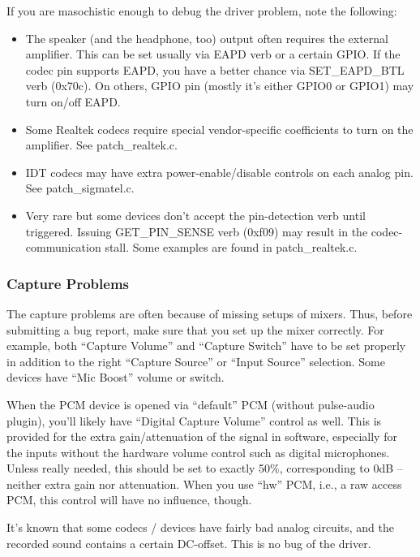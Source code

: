 \documentclass[a4paper,8pt,english]{sphinxmanual}
\begin{document}
If you are masochistic enough to debug the driver problem, note the
following:
\begin{itemize}
\item {} 
The speaker (and the headphone, too) output often requires the
external amplifier.  This can be set usually via EAPD verb or a
certain GPIO.  If the codec pin supports EAPD, you have a better
chance via SET\_EAPD\_BTL verb (0x70c).  On others, GPIO pin (mostly
it's either GPIO0 or GPIO1) may turn on/off EAPD.

\item {} 
Some Realtek codecs require special vendor-specific coefficients to
turn on the amplifier.  See patch\_realtek.c.

\item {} 
IDT codecs may have extra power-enable/disable controls on each
analog pin.  See patch\_sigmatel.c.

\item {} 
Very rare but some devices don't accept the pin-detection verb until
triggered.  Issuing GET\_PIN\_SENSE verb (0xf09) may result in the
codec-communication stall.  Some examples are found in
patch\_realtek.c.

\end{itemize}


\subsubsection{Capture Problems}
\label{sound/hd-audio/notes:capture-problems}
The capture problems are often because of missing setups of mixers.
Thus, before submitting a bug report, make sure that you set up the
mixer correctly.  For example, both ``Capture Volume'' and ``Capture
Switch'' have to be set properly in addition to the right ``Capture
Source'' or ``Input Source'' selection.  Some devices have ``Mic Boost''
volume or switch.

When the PCM device is opened via ``default'' PCM (without pulse-audio
plugin), you'll likely have ``Digital Capture Volume'' control as well.
This is provided for the extra gain/attenuation of the signal in
software, especially for the inputs without the hardware volume
control such as digital microphones.  Unless really needed, this
should be set to exactly 50\%, corresponding to 0dB -- neither extra
gain nor attenuation.  When you use ``hw'' PCM, i.e., a raw access PCM,
this control will have no influence, though.

It's known that some codecs / devices have fairly bad analog circuits,
and the recorded sound contains a certain DC-offset.  This is no bug
of the driver.
\end{document}

